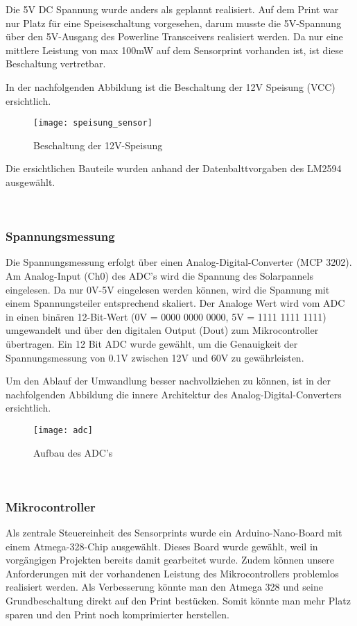 Die 5V DC Spannung wurde anders als geplannt realisiert. Auf dem Print war nur Platz für eine Speiseschaltung vorgesehen, darum musste die 5V-Spannung über den 5V-Ausgang des Powerline Transceivers realisiert werden. Da nur eine mittlere Leistung von max 100mW auf dem Sensorprint vorhanden ist, ist diese Beschaltung vertretbar.

In der nachfolgenden Abbildung ist die Beschaltung der 12V Speisung (VCC) ersichtlich.


\begin{figure}[h]
\centering
\texttt{[image: speisung\_sensor]}
\caption{Beschaltung der 12V-Speisung}
\end{figure}

Die ersichtlichen Bauteile wurden anhand der Datenbalttvorgaben des LM2594 ausgewählt.

\
\
\subsubsection{Spannungsmessung}
Die Spannungsmessung erfolgt über einen Analog-Digital-Converter (MCP 3202). Am Analog-Input (Ch0) des ADC's wird die Spannung des Solarpannels eingelesen. Da nur 0V-5V eingelesen werden können, wird die Spannung mit einem Spannungsteiler entsprechend skaliert. Der Analoge Wert wird vom ADC in einen binären 12-Bit-Wert (0V = 0000 0000 0000, 5V = 1111 1111 1111) umgewandelt und über den digitalen Output (Dout) zum Mikrocontroller übertragen. Ein 12 Bit ADC wurde gewählt, um die Genauigkeit der Spannungsmessung von 0.1V zwischen 12V und 60V zu gewährleisten.

Um den Ablauf der Umwandlung besser nachvollziehen zu können, ist in der nachfolgenden Abbildung die innere Architektur des Analog-Digital-Converters ersichtlich.

\clearpage
\begin{figure}[h]
\centering
\texttt{[image: adc]}
\caption{Aufbau des ADC's}
\end{figure}

\
\

\subsubsection{Mikrocontroller}
Als zentrale Steuereinheit des Sensorprints wurde ein Arduino-Nano-Board mit einem Atmega-328-Chip ausgewählt. Dieses Board wurde gewählt, weil in vorgängigen Projekten bereits damit gearbeitet wurde. Zudem können unsere Anforderungen mit der vorhandenen Leistung des Mikrocontrollers problemlos realisiert werden. Als Verbesserung könnte man den Atmega 328 und seine Grundbeschaltung direkt auf den Print bestücken. Somit könnte man mehr Platz sparen und den Print noch komprimierter herstellen.

